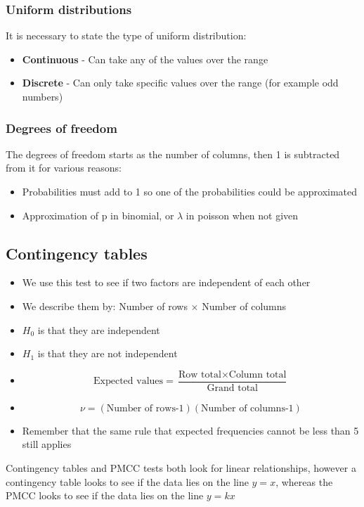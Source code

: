 \documentclass{article}[18pt]
\begin{document}
\subsubsection{Uniform distributions}
It is necessary to state the type of uniform distribution:
\begin{itemize}
\item \textbf{Continuous} - Can take any of the values over the range
\item \textbf{Discrete} - Can only take specific values over the range (for example odd numbers)
\end{itemize}
\subsubsection{Degrees of freedom}
The degrees of freedom starts as the number of columns, then 1 is subtracted from it for various reasons:
\begin{itemize}
\item Probabilities must add to 1 so one of the probabilities could be approximated
\item Approximation of p in binomial, or $\lambda$ in poisson when not given
\end{itemize}
\newpage
\subsection{Contingency tables}
\begin{itemize}
\item We use this test to see if two factors are independent of each other
\item We describe them by: Number of rows $\times$ Number of columns
\item $H_0$ is that they are independent
\item $H_1$ is that they are not independent
\item $$\textrm{Expected values}=\frac{\textrm{Row total}\times\textrm{Column total}}{\textrm{Grand total}}$$
\item $$\nu=(\textrm{Number of rows-1})(\textrm{Number of columns-1})$$
\item Remember that the same rule that expected frequencies cannot be less than 5 still applies
\end{itemize}
Contingency tables and PMCC tests both look for linear relationships, however a contingency table looks to see if the data lies on the line $y=x$, whereas the PMCC looks to see if the data lies on the line $y=kx$
\end{document}
